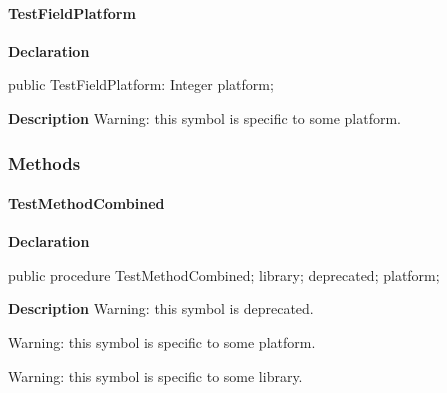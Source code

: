 \documentclass{report}
\begin{document}
\paragraph*{TestFieldPlatform}\hspace*{\fill}

\begin{list}{}{
\setlength{\itemindent}{0cm}
\setlength{\listparindent}{0cm}
\setlength{\leftmargin}{\evensidemargin}
\addtolength{\leftmargin}{\tmplength}
\settowidth{\labelsep}{X}
\addtolength{\leftmargin}{\labelsep}
\setlength{\labelwidth}{\tmplength}
}
\begin{flushleft}
\item[\textbf{Declaration}\hfill]
\begin{ttfamily}
public TestFieldPlatform: Integer platform;\end{ttfamily}


\end{flushleft}
\par
\item[\textbf{Description}]
Warning: this symbol is specific to some platform.

 

\end{list}
\subsubsection*{\large{\textbf{Methods}}\normalsize\hspace{1ex}\hfill}
\paragraph*{TestMethodCombined}\hspace*{\fill}

\begin{list}{}{
\setlength{\itemindent}{0cm}
\setlength{\listparindent}{0cm}
\setlength{\leftmargin}{\evensidemargin}
\addtolength{\leftmargin}{\tmplength}
\settowidth{\labelsep}{X}
\addtolength{\leftmargin}{\labelsep}
\setlength{\labelwidth}{\tmplength}
}
\begin{flushleft}
\item[\textbf{Declaration}\hfill]
\begin{ttfamily}
public procedure TestMethodCombined; library; deprecated; platform;\end{ttfamily}


\end{flushleft}
\par
\item[\textbf{Description}]
Warning: this symbol is deprecated.

Warning: this symbol is specific to some platform.

Warning: this symbol is specific to some library.

 

\end{list}
\end{document}
